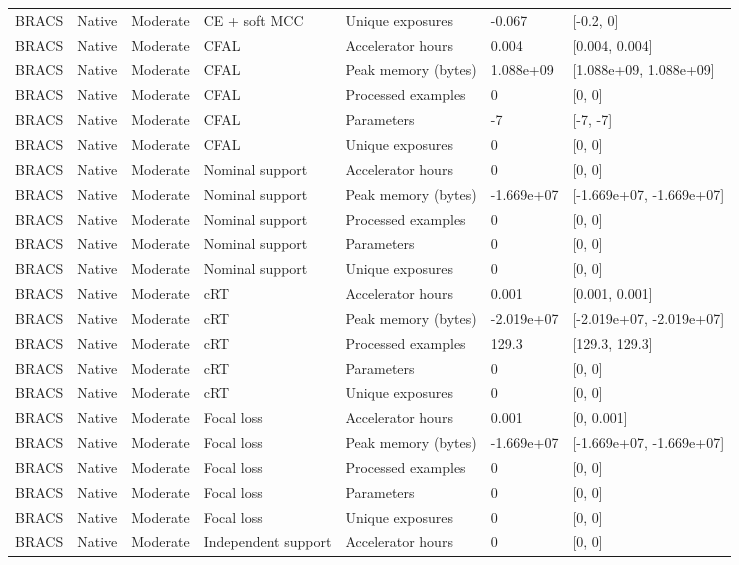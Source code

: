 \begin{longtable}{lllllll}
BRACS & Native & Moderate & CE + soft MCC & Unique exposures & -0.067 & [-0.2, 0] \\
BRACS & Native & Moderate & CFAL & Accelerator hours & 0.004 & [0.004, 0.004] \\
BRACS & Native & Moderate & CFAL & Peak memory (bytes) & 1.088e+09 & [1.088e+09, 1.088e+09] \\
BRACS & Native & Moderate & CFAL & Processed examples & 0 & [0, 0] \\
BRACS & Native & Moderate & CFAL & Parameters & -7 & [-7, -7] \\
BRACS & Native & Moderate & CFAL & Unique exposures & 0 & [0, 0] \\
BRACS & Native & Moderate & Nominal support & Accelerator hours & 0 & [0, 0] \\
BRACS & Native & Moderate & Nominal support & Peak memory (bytes) & -1.669e+07 & [-1.669e+07, -1.669e+07] \\
BRACS & Native & Moderate & Nominal support & Processed examples & 0 & [0, 0] \\
BRACS & Native & Moderate & Nominal support & Parameters & 0 & [0, 0] \\
BRACS & Native & Moderate & Nominal support & Unique exposures & 0 & [0, 0] \\
BRACS & Native & Moderate & cRT & Accelerator hours & 0.001 & [0.001, 0.001] \\
BRACS & Native & Moderate & cRT & Peak memory (bytes) & -2.019e+07 & [-2.019e+07, -2.019e+07] \\
BRACS & Native & Moderate & cRT & Processed examples & 129.3 & [129.3, 129.3] \\
BRACS & Native & Moderate & cRT & Parameters & 0 & [0, 0] \\
BRACS & Native & Moderate & cRT & Unique exposures & 0 & [0, 0] \\
BRACS & Native & Moderate & Focal loss & Accelerator hours & 0.001 & [0, 0.001] \\
BRACS & Native & Moderate & Focal loss & Peak memory (bytes) & -1.669e+07 & [-1.669e+07, -1.669e+07] \\
BRACS & Native & Moderate & Focal loss & Processed examples & 0 & [0, 0] \\
BRACS & Native & Moderate & Focal loss & Parameters & 0 & [0, 0] \\
BRACS & Native & Moderate & Focal loss & Unique exposures & 0 & [0, 0] \\
BRACS & Native & Moderate & Independent support & Accelerator hours & 0 & [0, 0] \\

\end{longtable}
